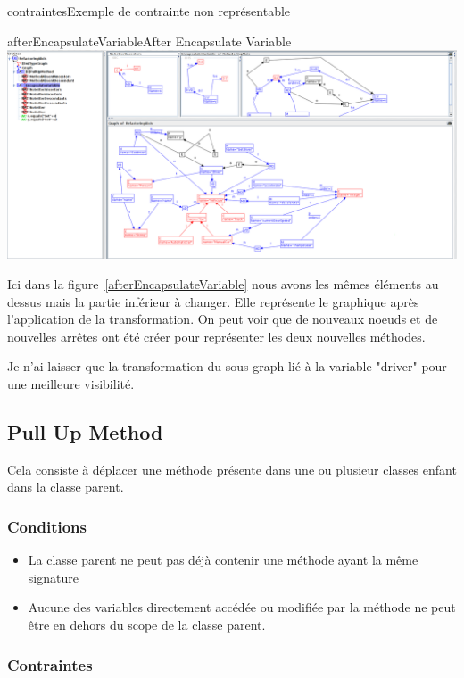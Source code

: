 \documentclass[a4paper, 12pt]{article}
\begin{document}
\begin{figu}{contraintes}{Exemple de contrainte non représentable}
\begin{myfig}{afterEncapsulateVariable}{After Encapsulate Variable}
\includegraphics[width=\textwidth]{afterEncapsulateVariable.png}
\end{myfig}

Ici dans la figure~\ref{afterEncapsulateVariable} nous avons les mêmes éléments au dessus mais la partie inférieur à changer.
Elle représente le graphique après l'application de la transformation. On peut voir que de nouveaux noeuds et de nouvelles arrêtes ont été créer pour représenter les deux nouvelles méthodes.

Je n'ai laisser que la transformation du sous graph lié à la variable "driver" pour une meilleure visibilité.

\subsection{Pull Up Method}

Cela consiste à déplacer une méthode présente dans une ou plusieur classes enfant dans la classe parent.

\subsubsection{Conditions}

\begin{itemize}[label=\textbullet]
\item La classe parent ne peut pas déjà contenir une méthode ayant la même signature
\item Aucune des variables directement accédée ou modifiée par la méthode ne peut être en dehors du scope de la classe parent.
\end{itemize}

\subsubsection{Contraintes}


\end{figu}
\end{document}
